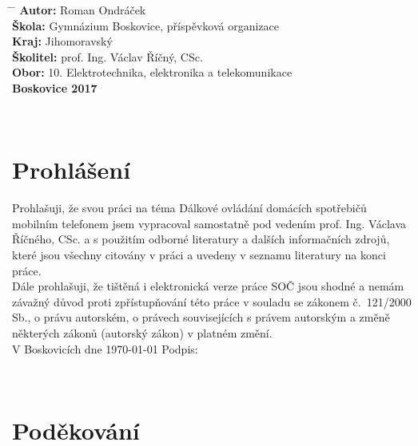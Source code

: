 \documentclass[12pt,a4paper,oneside]{article}
\begin{document}
\begin{tabbing}
\hspace{4mm} \= \hspace{24mm}  \=   \kill
\> \large \textbf{Autor:}     \> \large{Roman Ondráček}                                    \\[4mm]
\> \large \textbf{Škola:}     \> \large{Gymnázium Boskovice, příspěvková organizace}       \\[4mm]
\> \large \textbf{Kraj:}      \> \large{Jihomoravský}                                      \\[4mm]
\> \large \textbf{Školitel:}  \> \large{prof. Ing. Václav Říčný, CSc.}                     \\[4mm]
\> \large \textbf{Obor:}      \> \large{10. Elektrotechnika, elektronika a telekomunikace} \\[16mm]
\> \large \textbf{Boskovice 2017}
\end{tabbing}

\normalsize

\newpage

~ \vspace{88mm}

\section*{Prohlášení}

Prohlašuji, že svou práci na téma Dálkové ovládání domácích spotřebičů mobilním telefonem jsem vypracoval samostatně pod vedením prof. Ing. Václava Říčného, CSc. a s použitím odborné literatury a dalších informačních zdrojů, které jsou všechny citovány v práci a uvedeny v seznamu literatury na konci práce. \\
Dále prohlašuji, že tištěná i elektronická verze práce SOČ jsou shodné a nemám závažný důvod proti zpřístupňování této práce v souladu se zákonem č.~121/2000 Sb., o právu autorském, o právech souvisejících s právem autorským a změně některých zákonů (autorský zákon) v platném změní. \\[8mm]
V Boskovicích dne \today \hspace{24mm} Podpis: 

\newpage

~ \vspace{80mm}

\section*{Poděkování}
\end{document}
